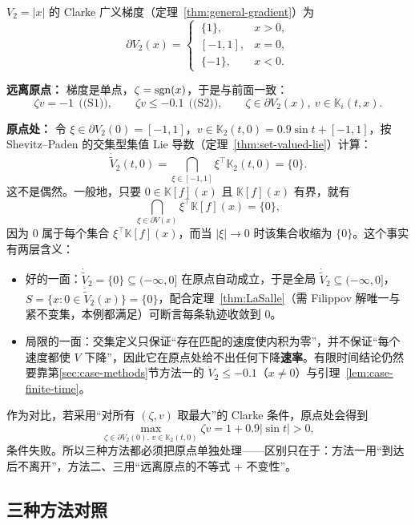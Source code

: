 $V_2=|x|$ 的 Clarke 广义梯度（定理~\ref{thm:general-gradient}）为
\[
\partial V_2(x)=
\begin{cases}
  \ \{1\}, & x>0,\\
  \,[-1,1], & x=0,\\
  \ \{-1\}, & x<0 .
\end{cases}
\]

\textbf{远离原点：} 梯度是单点，$\zeta=\operatorname{sgn}(x)$，于是与前面一致：
\[
\zeta v=-1\ \ \text{((S1))},
\qquad
\zeta v\le-0.1\ \ \text{((S2))},
\qquad
\zeta\in\partial V_2(x),\ v\in\mathbb{K}_i(t,x).
\]

\textbf{原点处：} 令 $\xi\in\partial V_2(0)=[-1,1]$，$v\in\mathbb{K}_2(t,0)=0.9\sin t+[-1,1]$，按 Shevitz--Paden 的交集型集值 Lie 导数（定理~\ref{thm:set-valued-lie}）计算：
\[
\dot{\tilde V}_2(t,0)=\bigcap_{\xi\in[-1,1]}\xi^\top\mathbb{K}_2(t,0)=\{0\}.
\]
这不是偶然。一般地，只要 $0\in\mathbb{K}[f](x)$ 且 $\mathbb{K}[f](x)$ 有界，就有
\[
\bigcap_{\xi\in\partial V(x)}\xi^\top\mathbb{K}[f](x)=\{0\},
\]
因为 $0$ 属于每个集合 $\xi^\top\mathbb{K}[f](x)$，而当 $|\xi|\to0$ 时该集合收缩为 $\{0\}$。这个事实有两层含义：

\begin{itemize}
  \item 好的一面：$\dot{\tilde V}_2=\{0\}\subseteq(-\infty,0]$ 在原点自动成立，于是全局 $\dot{\tilde V}_2\subseteq(-\infty,0]$，$S=\{x:0\in\dot{\tilde V}_2(x)\}=\{0\}$，配合定理~\ref{thm:LaSalle}（需 Filippov 解唯一与紧不变集，本例都满足）可断言每条轨迹收敛到 $0$。
  \item 局限的一面：交集定义只保证“存在匹配的速度使内积为零”，并不保证“每个速度都使 $V$ 下降”，因此它在原点处给不出任何下降\textbf{速率}。有限时间结论仍然要靠第\ref{sec:case-methods}节方法一的 $\dot V_2\le-0.1$（$x\neq0$）与引理~\ref{lem:case-finite-time}。
\end{itemize}

作为对比，若采用“对所有 $(\zeta,v)$ 取最大”的 Clarke 条件，原点处会得到
\[
\max_{\zeta\in\partial V_2(0),\,v\in\mathbb{K}_2(t,0)}\zeta v=1+0.9|\sin t|>0,
\]
条件失败。所以三种方法都必须把原点单独处理——区别只在于：方法一用“到达后不离开”，方法二、三用“远离原点的不等式 + 不变性”。

\subsection{三种方法对照}


